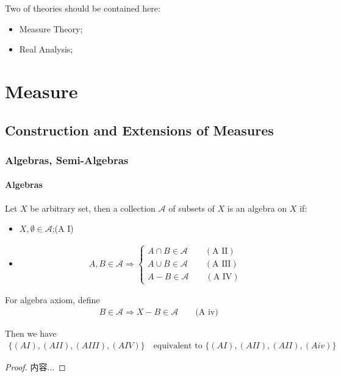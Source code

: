 \documentclass[Total.tex]{subfiles}
\begin{document}
	Two of theories should be contained here:
	\begin{itemize}
		\item Measure Theory;
		\item Real Analysis;
	\end{itemize}
	\chapter{Measure}
		\section{Construction and Extensions of Measures}
			\subsection{Algebras, Semi-Algebras}
				\subsubsection{Algebras}
					\begin{Def}
						Let $X$ be arbitrary set, then a collection $\mathcal{A}$ of subsets of $X$ is an algebra on $X$ if:
						\begin{itemize}
							\item $X,\emptyset\in \mathcal{A}$;(A I)
							\item \begin{gather*}
								A,B\in \mathcal{A}\Rightarrow \begin{cases}
									A\cap B\in \mathcal{A}\qquad (\mbox{A II})\\
									A\cup B\in \mathcal{A}\qquad(\mbox{A III})\\
									A-B\in \mathcal{A}\qquad (\mbox{A IV})
								\end{cases}
							\end{gather*}
						\end{itemize}
					\end{Def}
					
					\begin{proposition}
						For algebra axiom, define
						\begin{gather*}
						 	B\in \mathcal{A}\Rightarrow X-B\in \mathcal{A}\qquad\mbox{(A iv)}
						\end{gather*}
						
						Then we have
						\begin{gather*}
							\{(AI),(AII),(AIII),(AIV)\}\quad\mbox{equivalent to }\{(AI),(AII),(AII),(Aiv)\}
						\end{gather*}
					\end{proposition}
					\begin{proof}
						内容...
					\end{proof}
					
\end{document}
